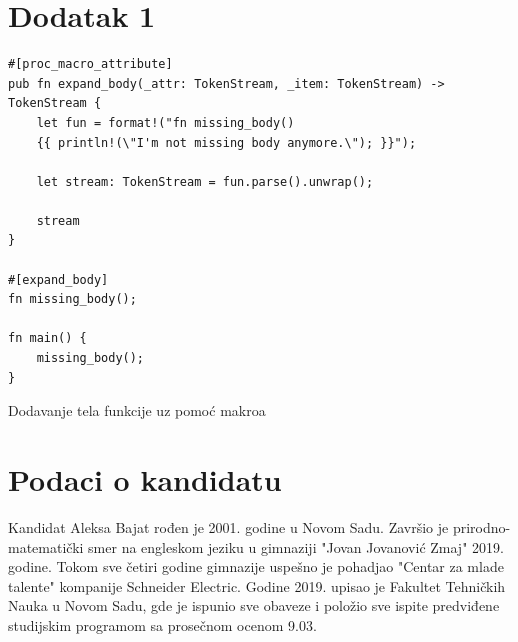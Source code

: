 \documentclass[11pt]{article}
\begin{document}
\newpage
\section{Dodatak 1}

\begin{listing}[H]
\begin{verbatim}
#[proc_macro_attribute]
pub fn expand_body(_attr: TokenStream, _item: TokenStream) -> TokenStream {
    let fun = format!("fn missing_body() 
    {{ println!(\"I'm not missing body anymore.\"); }}");

    let stream: TokenStream = fun.parse().unwrap();

    stream
}

#[expand_body]
fn missing_body();

fn main() {
    missing_body();
}
\end{verbatim}
\caption{Dodavanje tela funkcije uz pomoć makroa}
\label{lst:bonus_body_expand}
\end{listing}


\newpage
\section{Podaci o kandidatu}


Kandidat Aleksa Bajat rođen je 2001. godine u Novom Sadu. Završio je prirodno-matematički smer na engleskom jeziku 
u gimnaziji "Jovan Jovanović Zmaj" 2019. godine. Tokom sve četiri godine gimnazije uspešno je pohadjao 
"Centar za mlade talente" kompanije Schneider Electric.  Godine 2019. upisao je Fakultet 
Tehničkih Nauka u Novom Sadu, gde je ispunio sve obaveze i položio sve ispite predviđene 
studijskim programom sa prosečnom ocenom 9.03.
\end{document}
